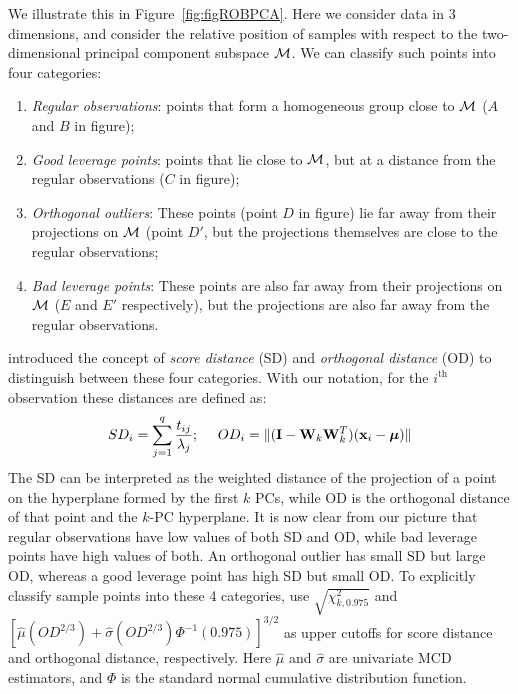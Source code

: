 We illustrate this in Figure~\ref{fig:figROBPCA}. Here we consider data in 3 dimensions, and consider the relative position of samples with respect to the two-dimensional principal component subspace ${\cal{M}}$. We can classify such points into four categories:

\begin{enumerate}
\item{\it Regular observations}: points that form a homogeneous group close to ${\cal{M}}$ ($A$ and $B$ in figure);
\item{\it Good leverage points}: points that lie close to ${\cal{M}}$, but at a distance from the regular observations ($C$ in figure);
\item{\it Orthogonal outliers}: These points (point $D$ in figure) lie far away from their projections on ${\cal{M}}$ (point $D'$, but the projections themselves are close to the regular observations;
\item{\it Bad leverage points}: These points are also far away from their projections on ${\cal{M}}$ ($E$ and $E'$ respectively), but the projections are also far away from the regular observations.
\end{enumerate}

\cite{hubert05} introduced the concept of \textit{score distance} (SD) and \textit{orthogonal distance} (OD) to distinguish between these four categories. With our notation, for the $i^\text{th}$ observation these distances are defined as:
%
$$
SD_i = \sum_{j=1}^q \frac{t_{ij}}{\lambda_j};\
\quad OD_i  =\| ( {\mathbf{I}} - {\mathbf{W}}_k {\mathbf{W}}_k^T) ({\bf{x}}_i - {\boldsymbol{\mu}}) \|
$$
%
The SD can be interpreted as the weighted distance of the projection of a point on the hyperplane formed by the first $k$ PCs, while OD is the orthogonal distance of that point and the $k$-PC hyperplane. It is now clear from our picture that regular observations have low values of both SD and OD, while bad leverage points have high values of both. An orthogonal outlier has small SD but large OD, whereas a good leverage point has high SD but small OD. To explicitly classify sample points into these 4 categories, \cite{hubert05} use $\sqrt {\chi^2_{k,0.975}}$ and $[ \hat \mu (OD^{2/3}) + \hat \sigma (OD^{2/3}) \Phi^{-1} (0.975) ]^{3/2}$ as upper cutoffs for score distance and orthogonal distance, respectively. Here $\hat \mu$ and $\hat \sigma$ are univariate MCD estimators, and $\Phi$ is the standard normal cumulative distribution function.